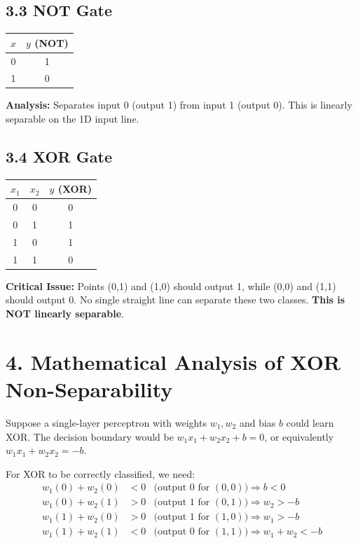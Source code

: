 \documentclass[11pt]{article}
\begin{document}
\subsection*{3.3 NOT Gate}
\begin{center}
\begin{tabular}{|c|c|}
\hline
$x$ & $y$ (NOT)\\ \hline
0 & 1\\ \hline
1 & 0\\ \hline
\end{tabular}
\end{center}
\textbf{Analysis:} Separates input 0 (output 1) from input 1 (output 0). This is linearly separable on the 1D input line.

\subsection*{3.4 XOR Gate}
\begin{center}
\begin{tabular}{|c|c|c|}
\hline
$x_1$ & $x_2$ & $y$ (XOR)\\ \hline
0 & 0 & 0\\ \hline
0 & 1 & 1\\ \hline
1 & 0 & 1\\ \hline
1 & 1 & 0\\ \hline
\end{tabular}
\end{center}
\textbf{Critical Issue:} Points (0,1) and (1,0) should output 1, while (0,0) and (1,1) should output 0. No single straight line can separate these two classes. \textbf{This is NOT linearly separable}.

\section*{4. Mathematical Analysis of XOR Non-Separability}

Suppose a single-layer perceptron with weights $w_1, w_2$ and bias $b$ could learn XOR. The decision boundary would be $w_1 x_1 + w_2 x_2 + b = 0$, or equivalently $w_1 x_1 + w_2 x_2 = -b$.

For XOR to be correctly classified, we need:
\begin{align*}
w_1(0) + w_2(0) &< 0 & \text{(output 0 for } (0,0)) \Rightarrow b < 0\\
w_1(0) + w_2(1) &> 0 & \text{(output 1 for } (0,1)) \Rightarrow w_2 > -b\\
w_1(1) + w_2(0) &> 0 & \text{(output 1 for } (1,0)) \Rightarrow w_1 > -b\\
w_1(1) + w_2(1) &< 0 & \text{(output 0 for } (1,1)) \Rightarrow w_1 + w_2 < -b
\end{align*}
\end{document}
